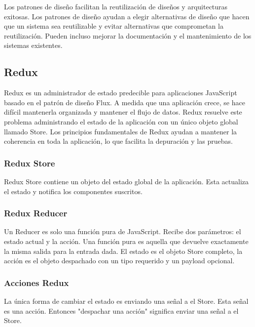 Los patrones de diseño facilitan la reutilización de diseños y arquitecturas exitosas. Los patrones de diseño ayudan a elegir alternativas de diseño que hacen que un sistema sea reutilizable y evitar alternativas que comprometan la reutilización. Pueden incluso mejorar la documentación y el mantenimiento de los sistemas existentes.
\subsection{Redux}
Redux es un administrador de estado predecible para aplicaciones JavaScript basado en el patrón de diseño Flux. A medida que una aplicación crece, se hace difícil mantenerla organizada y mantener el flujo de datos. Redux resuelve este problema administrando el estado de la aplicación con un único objeto global llamado Store. Los principios fundamentales de Redux ayudan a mantener la coherencia en toda la aplicación, lo que facilita la depuración y las pruebas.
\subsubsection{Redux Store}
Redux Store contiene un objeto del estado global de la aplicación. Esta actualiza el estado y notifica los componentes suscritos. \\[0.8cm]


\subsubsection{Redux Reducer}
Un Reducer es solo una función pura de JavaScript. Recibe dos parámetros: el estado actual y la acción. Una función pura es aquella que devuelve exactamente la misma salida para la entrada dada. El estado es el objeto Store completo, la acción es el objeto despachado con un tipo requerido y un payload opcional. \\[0.8cm]


\subsubsection{Acciones Redux}
La única forma de cambiar el estado es enviando una señal a el Store. Esta señal es una acción. Entonces "despachar una acción" significa enviar una señal a el Store. \\[0.8cm]

